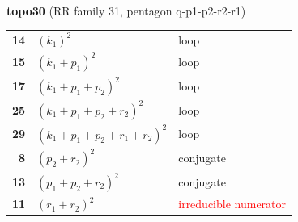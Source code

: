 \documentclass[10pt]{article}
\begin{document}
\begin{minipage}[t]{0.48\textwidth}
{}\\[2mm]\textbf{topo30} (RR family 31, pentagon q-p1-p2-r2-r1)\\[2pt]{\footnotesize\begin{tabular}{@{}r@{\ \ }l@{\ \ }l@{}}\textbf{14} & $(k_1)^2$ & loop\\
\textbf{15} & $(k_1+p_1)^2$ & loop\\
\textbf{17} & $(k_1+p_1+p_2)^2$ & loop\\
\textbf{25} & $(k_1+p_1+p_2+r_2)^2$ & loop\\
\textbf{29} & $(k_1+p_1+p_2+r_1+r_2)^2$ & loop\\
\textbf{8} & $(p_2+r_2)^2$ & conjugate\\
\textbf{13} & $(p_1+p_2+r_2)^2$ & conjugate\\
\textbf{11} & $(r_1+r_2)^2$ & \textcolor{red}{irreducible numerator}\\\end{tabular}}\end{minipage}

\bigskip
\end{document}
